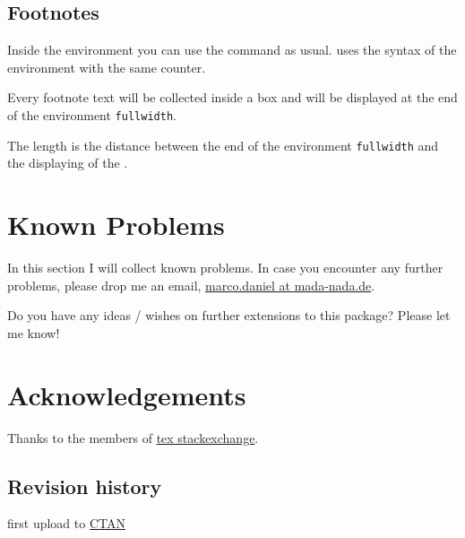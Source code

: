 \documentclass[parskip=false,english,11pt]{ltxmdf}
\def\fwdname{\texttt{fullwidth}\xspace}
\begin{document}
\subsection{Footnotes}
Inside the environment you can use the command  as usual. \mdname uses the syntax of the environment  with the same counter.

Every footnote text will be collected inside a box and will be displayed at the end of the environment \fwdname. 

 The length is the distance between the end of the environment \fwdname and the displaying of the .

%


\section{Known Problems}
 In this section I will collect known problems. In case you encounter any further problems, please
 drop me an email, \href{mailto:marco.daniel@mada-nada.de}{marco.daniel at mada-nada.de}.

   Do you have any ideas / wishes on further extensions to this package? Please let me know!

\section{Acknowledgements}
Thanks to the members of \href{http://tex.stackexchange.com/}{tex stackexchange}.

\subsection{Revision history}\label{rev}
\raggedright
{}
\begin{itemize*}
\item first upload to \href{http://dante.ctan.org/upload}{CTAN}
\end{itemize*}
\end{document}
